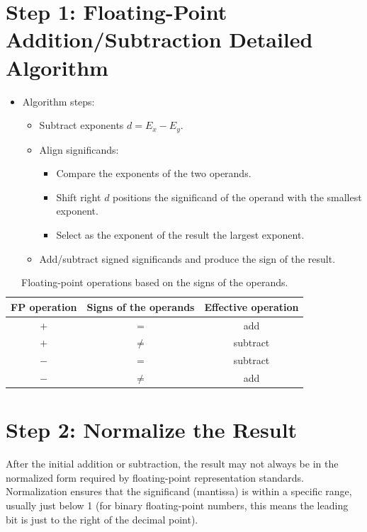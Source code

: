 \documentclass[12pt,openany, tikz,border=10pt]{book}
\begin{document}
    \section*{Step 1: Floating-Point Addition/Subtraction Detailed Algorithm}
    \begin{itemize}
        \item[] Algorithm steps:
        \begin{itemize}
            \item Subtract exponents \(d = E_x - E_y\).
            \item Align significands:
            \begin{itemize}
                \item Compare the exponents of the two operands.
                \item Shift right \(d\) positions the significand of the operand with the smallest exponent.
                \item Select as the exponent of the result the largest exponent.
            \end{itemize}
            \item Add/subtract signed significands and produce the sign of the result.
        \end{itemize}
    \end{itemize}
    
    \begin{table}[h]
    \centering
    \caption{Floating-point operations based on the signs of the operands.}
    \begin{tabular}{ccc}
    \toprule
    FP operation & Signs of the operands & Effective operation \\
    \midrule
    \(+\)        & \(=\)                 & add                 \\
    \(+\)        & \(\neq\)              & subtract            \\
    \(-\)        & \(=\)                 & subtract            \\
    \(-\)        & \(\neq\)              & add                 \\
    \bottomrule
    \end{tabular}
    \end{table}
    
    \section*{Step 2: Normalize the Result}
    After the initial addition or subtraction, the result may not always be in the normalized form required by floating-point representation standards. Normalization ensures that the significand (mantissa) is within a specific range, usually just below 1 (for binary floating-point numbers, this means the leading bit is just to the right of the decimal point).
    
\end{document}
